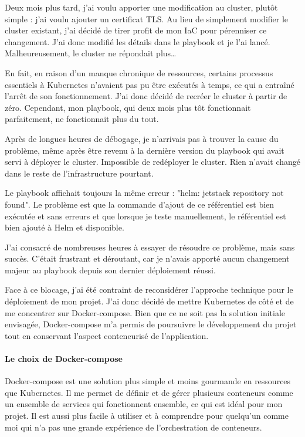 Deux mois plus tard, j'ai voulu apporter une modification au cluster, plutôt simple : j'ai voulu ajouter un certificat TLS.
Au lieu de simplement modifier le cluster existant, j'ai décidé de tirer profit de mon IaC pour pérenniser ce changement.
J'ai donc modifié les détails dans le playbook et je l'ai lancé.
Malheureusement, le cluster ne répondait plus\ldots

En fait, en raison d'un manque chronique de ressources, certains processus essentiels
à Kubernetes n'avaient pas pu être exécutés à temps, ce qui a entraîné l'arrêt de son fonctionnement.
J'ai donc décidé de recréer le cluster à partir de zéro.
Cependant, mon playbook, qui deux mois plus tôt fonctionnait parfaitement, ne fonctionnait plus du tout.

Après de longues heures de débogage, je n'arrivais pas à trouver la cause du problème,
même après être revenu à la dernière version du playbook qui avait servi à déployer le cluster.
Impossible de redéployer le cluster.
Rien n'avait changé dans le reste de l'infrastructure pourtant.

Le playbook affichait toujours la même erreur : "helm: jetstack repository not found". %
Le problème est que la commande d'ajout de ce référentiel est bien exécutée et sans erreurs et que lorsque je teste manuellement,
le référentiel est bien ajouté à Helm et disponible.

J'ai consacré de nombreuses heures à essayer de résoudre ce problème, mais sans succès.
C'était frustrant et déroutant, car je n'avais apporté aucun changement majeur au playbook depuis son dernier déploiement réussi.

Face à ce blocage, j'ai été contraint de reconsidérer l'approche technique pour le déploiement de mon projet.
J'ai donc décidé de mettre Kubernetes de côté et de me concentrer sur Docker-compose.
Bien que ce ne soit pas la solution initiale envisagée,
Docker-compose m'a permis de poursuivre le développement du projet tout en conservant l'aspect conteneurisé de l'application.

\paragraph{Le choix de Docker-compose}

Docker-compose est une solution plus simple et moins gourmande en ressources que Kubernetes.
Il me permet de définir et de gérer plusieurs conteneurs comme un ensemble de services qui fonctionnent ensemble,
ce qui est idéal pour mon projet.
Il est aussi plus facile à utiliser et à comprendre pour quelqu'un comme moi qui n'a pas une grande expérience de l'orchestration de conteneurs.

